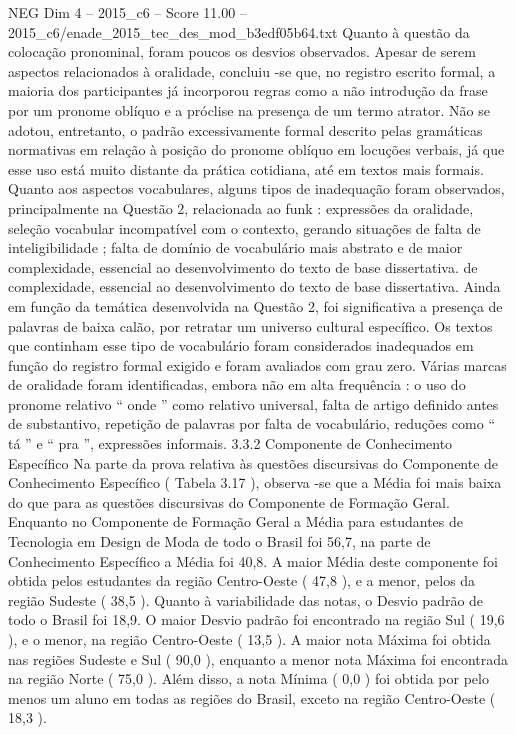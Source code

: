 \begin{textsample}{NEG Dim 4 – 2015\_c6 – Score 11.00 – 2015\_c6/enade\_2015\_tec\_des\_mod\_b3edf05b64.txt}
Quanto à questão da colocação pronominal, foram poucos os desvios observados.
Apesar de serem aspectos relacionados à oralidade, concluiu -se que, no registro escrito formal, a maioria dos participantes já incorporou regras como a não introdução da frase por um pronome oblíquo e a próclise na presença de um termo atrator.
Não se adotou, entretanto, o padrão excessivamente formal descrito pelas gramáticas normativas em relação à posição do pronome oblíquo em locuções verbais, já que esse uso está muito distante da prática cotidiana, até em textos mais formais.
Quanto aos aspectos vocabulares, alguns tipos de inadequação foram observados, principalmente na Questão 2, relacionada ao funk : expressões da oralidade, seleção vocabular incompatível com o contexto, gerando situações de falta de inteligibilidade ; falta de domínio de vocabulário mais abstrato e de maior complexidade, essencial ao desenvolvimento do texto de base dissertativa. de complexidade, essencial ao desenvolvimento do texto de base dissertativa.
Ainda em função da temática desenvolvida na Questão 2, foi significativa a presença de palavras de baixa calão, por retratar um universo cultural específico.
Os textos que continham esse tipo de vocabulário foram considerados inadequados em função do registro formal exigido e foram avaliados com grau zero.
Várias marcas de oralidade foram identificadas, embora não em alta frequência : o uso do pronome relativo “ onde ” como relativo universal, falta de artigo definido antes de substantivo, repetição de palavras por falta de vocabulário, reduções como “ tá ” e “ pra ”, expressões informais. 3.3.2 Componente de Conhecimento Específico Na parte da prova relativa às questões discursivas do Componente de Conhecimento Específico ( Tabela 3.17 ), observa -se que a Média foi mais baixa do que para as questões discursivas do Componente de Formação Geral.
Enquanto no Componente de Formação Geral a Média para estudantes de Tecnologia em Design de Moda de todo o Brasil foi 56,7, na parte de Conhecimento Específico a Média foi 40,8.
A maior Média deste componente foi obtida pelos estudantes da região Centro-Oeste ( 47,8 ), e a menor, pelos da região Sudeste ( 38,5 ).
Quanto à variabilidade das notas, o Desvio padrão de todo o Brasil foi 18,9.
O maior Desvio padrão foi encontrado na região Sul ( 19,6 ), e o menor, na região Centro-Oeste ( 13,5 ).
A maior nota Máxima foi obtida nas regiões Sudeste e Sul ( 90,0 ), enquanto a menor nota Máxima foi encontrada na região Norte ( 75,0 ).
Além disso, a nota Mínima ( 0,0 ) foi obtida por pelo menos um aluno em todas as regiões do Brasil, exceto na região Centro-Oeste ( 18,3 ).

\end{textsample}
